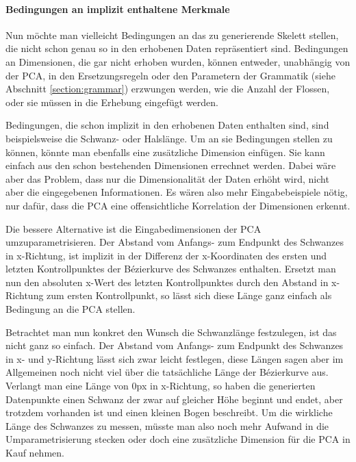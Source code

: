  \paragraph{Bedingungen an implizit enthaltene Merkmale}
 Nun möchte man vielleicht Bedingungen an das zu generierende Skelett stellen, die nicht schon genau so in den erhobenen Daten repräsentiert sind. 
 Bedingungen an Dimensionen, die gar nicht erhoben wurden, können  entweder, unabhängig von der PCA, in den Ersetzungsregeln oder den Parametern der Grammatik (siehe Abschnitt \ref{section:grammar}) erzwungen werden, wie \zb die Anzahl der Flossen, oder sie müssen in die Erhebung eingefügt werden.
 
 Bedingungen, die schon implizit in den erhobenen Daten enthalten sind, sind beispielsweise die Schwanz- oder Halslänge. Um an sie Bedingungen stellen zu können, könnte man ebenfalls eine zusätzliche Dimension einfügen. Sie kann einfach aus den schon bestehenden Dimensionen errechnet werden. Dabei wäre aber das Problem, dass nur die Dimensionalität der Daten erhöht wird, nicht aber die eingegebenen Informationen. Es wären also mehr Eingabebeispiele nötig, nur dafür, dass die PCA eine offensichtliche Korrelation der Dimensionen erkennt.
 
 Die bessere Alternative ist die Eingabedimensionen der PCA umzuparametrisieren. Der Abstand vom Anfangs- zum Endpunkt des Schwanzes in x-Richtung, ist \zb implizit in der Differenz der x-Koordinaten des ersten und letzten Kontrollpunktes der Bézierkurve des Schwanzes enthalten. Ersetzt man nun den absoluten x-Wert des letzten Kontrollpunktes durch den Abstand in x-Richtung zum ersten Kontrollpunkt, so lässt sich diese Länge ganz einfach als Bedingung an die PCA stellen. 
 
 Betrachtet man nun konkret den Wunsch die Schwanzlänge festzulegen, ist das nicht ganz so einfach. Der Abstand vom Anfangs- zum Endpunkt des Schwanzes in x- und y-Richtung lässt sich zwar leicht festlegen, diese Längen sagen aber im Allgemeinen noch nicht viel über die tatsächliche Länge der Bézierkurve aus. Verlangt man \zb eine Länge von $0$px in x-Richtung, so haben die generierten Datenpunkte einen Schwanz der zwar auf gleicher Höhe beginnt und endet, aber trotzdem vorhanden ist und einen kleinen Bogen beschreibt.
 Um die wirkliche Länge des Schwanzes zu messen, müsste man also noch mehr Aufwand in die Umparametrisierung stecken oder doch eine zusätzliche Dimension für die PCA in Kauf nehmen.
 
 
